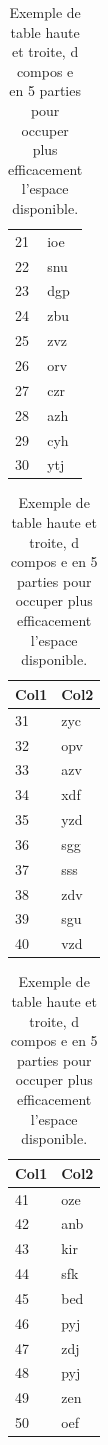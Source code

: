 \documentclass{article}
\begin{document}
\begin{table}[htb]
\begin{minipage}[t]{0.19\linewidth}
\begin{tabular}{l l}
			21 & ioe \\
			22 & snu \\
			23 & dgp \\
			24 & zbu \\
			25 & zvz \\
			26 & orv \\
			27 & czr \\
			28 & azh \\
			29 & cyh \\
			30 & ytj \\
			\hline
		\end{tabular}
	\end{minipage}
	\begin{minipage}[t]{0.19\linewidth}
		\centering
		\begin{tabular}{l l}
			\hline
			\rowcolor{DarkColor} 
			\textbf{Col1} 			& \textbf{Col2} \\ 
			\hline
			31 & zyc \\
			32 & opv \\
			33 & azv \\
			34 & xdf \\
			35 & yzd \\
			36 & sgg \\
			37 & sss \\
			38 & zdv \\
			39 & sgu \\
			40 & vzd \\
			\hline
		\end{tabular}
	\end{minipage}
	\begin{minipage}[t]{0.19\linewidth}
		\centering
		\begin{tabular}{l l}
			\hline
			\rowcolor{DarkColor} 
			\textbf{Col1} 			& \textbf{Col2} \\ 
			\hline
			41 & oze \\
			42 & anb \\
			43 & kir \\
			44 & sfk \\
			45 & bed \\
			46 & pyj \\
			47 & zdj \\
			48 & pyj \\
			49 & zen \\
			50 & oef \\
			\hline
		\end{tabular}
	\end{minipage}
	\caption{Exemple de table haute et  troite, d compos e en 5 parties pour occuper plus efficacement l'espace disponible.}
	\label{tab:etroit}
\end{table}
\end{document}
